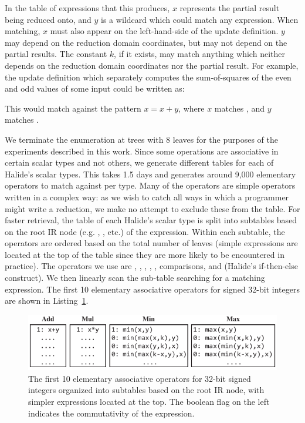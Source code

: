 In the table of expressions that this produces, $x$ represents the partial result being reduced onto, and $y$ is a wildcard which could match any expression. When matching, $x$ must also appear on the left-hand-side of the update definition. $y$ may depend on the reduction domain coordinates, but may not depend on the partial results. The constant $k$, if it exists, may match anything which neither depends on the reduction domain coordinates nor the partial result. For example, the update definition which separately computes the sum-of-squares of the even and odd values of some input  could be written as:


\noindent This would match against the pattern $x = x + y$, where $x$ matches , and $y$ matches .

We terminate the enumeration at trees with 8 leaves for the purposes of the experiments described in this work. Since some operations are associative in certain scalar types and not others, we generate different tables for each of Halide's scalar types.  This takes 1.5 days and generates around 9,000 elementary operators to match against per type. Many of the operators are simple operators written in a complex way: as we wish to catch all ways in which a programmer might write a reduction, we make no attempt to exclude these from the table. For faster retrieval, the table of each Halide's scalar type is split into subtables based on the root IR node (e.g. , , etc.) of the expression. Within each subtable, the operators are ordered based on the total number of leaves (simple expressions are located at the top of the table since they are more likely to be encountered in practice). The operators we use are , , , , , comparisons, and  (Halide’s if-then-else construct). We then linearly scan the sub-table searching for a matching expression. The first 10 elementary associative operators for signed 32-bit integers are shown in Listing~\ref{fig:top10}. 

\begin{figure}
\centering
\includegraphics[width=\columnwidth]{tables}
\caption{The first 10 elementary associative operators for 32-bit signed integers organized into subtables based on the root IR node, with simpler expressions located at the top. The boolean flag on the left indicates the commutativity of the expression.}
\label{fig:top10}
\end{figure}

